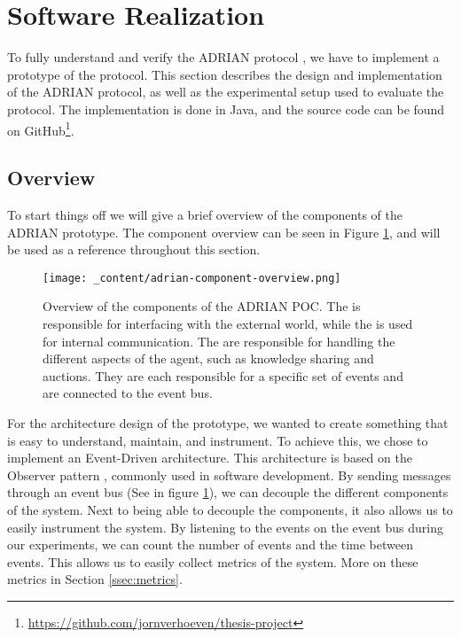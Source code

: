 \section{Software Realization}
\label{sec:software-realization}
To fully understand and verify the ADRIAN protocol \cite{mann2023ADRIAN}, we have to implement a prototype of the protocol. This section describes the design and implementation of the ADRIAN protocol, as well as the experimental setup used to evaluate the protocol. The implementation is done in Java, and the source code can be found on GitHub\footnote{\url{https://github.com/jornverhoeven/thesis-project}}. 


\subsection{Overview}
\label{ssec:overview}
To start things off we will give a brief overview of the components of the ADRIAN prototype. The component overview can be seen in Figure \ref{fig:adrian-component-overview}, and will be used as a reference throughout this section.

\begin{figure}[H]
    \centering
    \texttt{[image: \_content/adrian-component-overview.png]}
    \caption{Overview of the components of the ADRIAN POC. The  is responsible for interfacing with the external world, while the  is used for internal communication. The  are responsible for handling the different aspects of the agent, such as knowledge sharing and auctions. They are each responsible for a specific set of events and are connected to the event bus.}
    \label{fig:adrian-component-overview}
\end{figure}

For the architecture design of the prototype, we wanted to create something that is easy to understand, maintain, and instrument. To achieve this, we chose to implement an Event-Driven architecture. This architecture is based on the Observer pattern \cite{gamma1995design}, commonly used in software development. By sending messages through an event bus (See  in figure \ref{fig:adrian-component-overview}), we can decouple the different components of the system. Next to being able to decouple the components, it also allows us to easily instrument the system. By listening to the events on the event bus during our experiments, we can count the number of events and the time between events. This allows us to easily collect metrics of the system. More on these metrics in Section \ref{ssec:metrics}.


